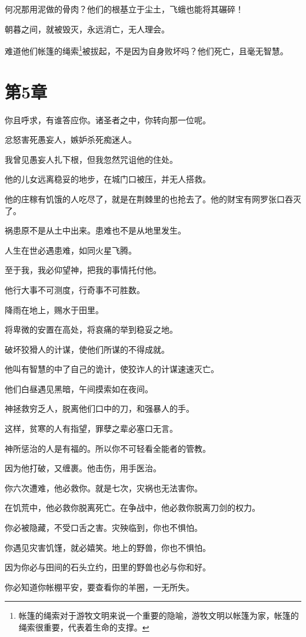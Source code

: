 \documentclass[12pt,oneside]{book}
\begin{document}
何况那用泥做的骨肉？他们的根基立于尘土，飞蛾也能将其碾碎！

朝暮之间，就被毁灭，永远消亡，无人理会。

难道他们帐篷的绳索\footnote{帐篷的绳索对于游牧文明来说一个重要的隐喻，游牧文明以帐篷为家，帐篷的绳索很重要，代表着生命的支撑。}被拔起，不是因为自身败坏吗？他们死亡，且毫无智慧。


\chapter{第5章}
你且呼求，有谁答应你。诸圣者之中，你转向那一位呢。

忿怒害死愚妄人，嫉妒杀死痴迷人。

我曾见愚妄人扎下根，但我忽然咒诅他的住处。

他的儿女远离稳妥的地步，在城门口被压，并无人搭救。

他的庄稼有饥饿的人吃尽了，就是在荆棘里的也抢去了。他的财宝有网罗张口吞灭了。

祸患原不是从土中出来。患难也不是从地里发生。

人生在世必遇患难，如同火星飞腾。

至于我，我必仰望神，把我的事情托付他。

他行大事不可测度，行奇事不可胜数。

降雨在地上，赐水于田里。

将卑微的安置在高处，将哀痛的举到稳妥之地。

破坏狡猾人的计谋，使他们所谋的不得成就。

他叫有智慧的中了自己的诡计，使狡诈人的计谋速速灭亡。

他们白昼遇见黑暗，午间摸索如在夜间。

神拯救穷乏人，脱离他们口中的刀，和强暴人的手。

这样，贫寒的人有指望，罪孽之辈必塞口无言。

神所惩治的人是有福的。所以你不可轻看全能者的管教。

因为他打破，又缠裹。他击伤，用手医治。

你六次遭难，他必救你。就是七次，灾祸也无法害你。

在饥荒中，他必救你脱离死亡。在争战中，他必救你脱离刀剑的权力。

你必被隐藏，不受口舌之害。灾殃临到，你也不惧怕。

你遇见灾害饥馑，就必嬉笑。地上的野兽，你也不惧怕。

因为你必与田间的石头立约，田里的野兽也必与你和好。

你必知道你帐棚平安，要查看你的羊圈，一无所失。
\end{document}
